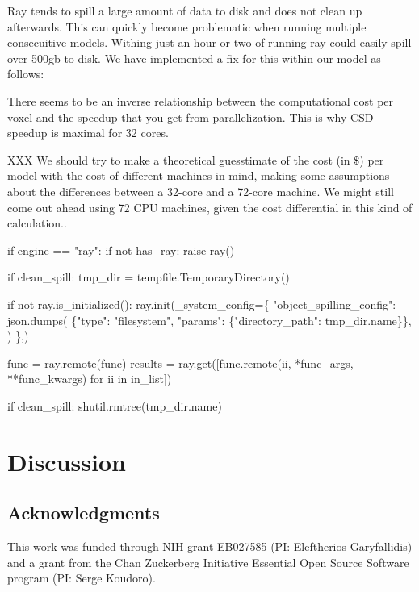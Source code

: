 \documentclass[
  letterpaper,
  DIV=11,
  numbers=noendperiod]{scrartcl}
\newenvironment{Shaded}{\begin{snugshade}}{\end{snugshade}}
\newcommand{\ControlFlowTok}[1]{\textcolor[rgb]{0.00,0.23,0.31}{#1}}
\newcommand{\KeywordTok}[1]{\textcolor[rgb]{0.00,0.23,0.31}{#1}}
\newcommand{\NormalTok}[1]{\textcolor[rgb]{0.00,0.23,0.31}{#1}}
\newcommand{\OperatorTok}[1]{\textcolor[rgb]{0.37,0.37,0.37}{#1}}
\newcommand{\StringTok}[1]{\textcolor[rgb]{0.13,0.47,0.30}{#1}}
\begin{document}
Ray tends to spill a large amount of data to disk and does not clean up
afterwards. This can quickly become problematic when running multiple
consecuitive models. Withing just an hour or two of running ray could
easily spill over 500gb to disk. We have implemented a fix for this
within our model as follows:

There seems to be an inverse relationship between the computational cost
per voxel and the speedup that you get from parallelization. This is why
CSD speedup is maximal for 32 cores.

XXX We should try to make a theoretical guesstimate of the cost (in \$)
per model with the cost of different machines in mind, making some
assumptions about the differences between a 32-core and a 72-core
machine. We might still come out ahead using 72 CPU machines, given the
cost differential in this kind of calculation..

\begin{Shaded}
\begin{Highlighting}[]
    \ControlFlowTok{if}\NormalTok{ engine }\OperatorTok{==} \StringTok{"ray"}\NormalTok{:}
        \ControlFlowTok{if} \KeywordTok{not}\NormalTok{ has\_ray:}
            \ControlFlowTok{raise}\NormalTok{ ray()}

        \ControlFlowTok{if}\NormalTok{ clean\_spill:}
\NormalTok{            tmp\_dir }\OperatorTok{=}\NormalTok{ tempfile.TemporaryDirectory()}

            \ControlFlowTok{if} \KeywordTok{not}\NormalTok{ ray.is\_initialized():}
\NormalTok{                ray.init(\_system\_config}\OperatorTok{=}\NormalTok{\{}
                    \StringTok{"object\_spilling\_config"}\NormalTok{: json.dumps(}
\NormalTok{                        \{}\StringTok{"type"}\NormalTok{: }\StringTok{"filesystem"}\NormalTok{, }\StringTok{"params"}\NormalTok{: \{}\StringTok{"directory\_path"}\NormalTok{:}
\NormalTok{                         tmp\_dir.name\}\},}
\NormalTok{                    )}
\NormalTok{                \},)}

\NormalTok{        func }\OperatorTok{=}\NormalTok{ ray.remote(func)}
\NormalTok{        results }\OperatorTok{=}\NormalTok{ ray.get([func.remote(ii, }\OperatorTok{*}\NormalTok{func\_args, }\OperatorTok{**}\NormalTok{func\_kwargs)}
                          \ControlFlowTok{for}\NormalTok{ ii }\KeywordTok{in}\NormalTok{ in\_list])}

        \ControlFlowTok{if}\NormalTok{ clean\_spill:}
\NormalTok{            shutil.rmtree(tmp\_dir.name)}
\end{Highlighting}
\end{Shaded}

\section{Discussion}\label{discussion}

\subsection{Acknowledgments}\label{acknowledgments}

This work was funded through NIH grant EB027585 (PI: Eleftherios
Garyfallidis) and a grant from the Chan Zuckerberg Initiative Essential
Open Source Software program (PI: Serge Koudoro).
\end{document}
